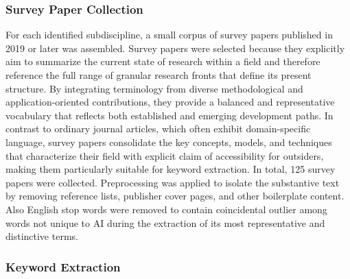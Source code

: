 \documentclass{article}
\begin{document}
	\subsubsection{Survey Paper Collection}
	
	For each identified subdiscipline, a small corpus of survey papers published in 2019 or later was assembled. Survey papers were selected because they explicitly aim to summarize the current state of research within a field and therefore reference the full range of granular research fronts that define its present structure. By integrating terminology from diverse methodological and application-oriented contributions, they provide a balanced and representative vocabulary that reflects both established and emerging development paths. In contrast to ordinary journal articles, which often exhibit domain-specific language, survey papers consolidate the key concepts, models, and techniques that characterize their field with explicit claim of accessibility for outsiders, making them particularly suitable for keyword extraction. In total, 125 survey papers were collected. Preprocessing was applied to isolate the substantive text by removing reference lists, publisher cover pages, and other boilerplate content. Also English stop words were removed to contain coincidental outlier among words not unique to AI during the extraction of its most representative and distinctive terms.
	
	
	\subsubsection{Keyword Extraction}
	
\end{document}
